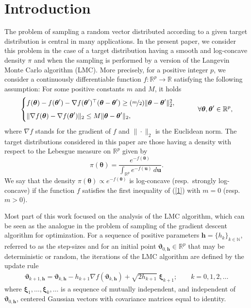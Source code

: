 \documentclass[aoap,preprint,reqno,a4paper]{imsart} %
\newcommand{\RR}{\mathbb{R}}
\newcommand{\NN}{\mathbb{N}}
\newcommand{\btheta}{\boldsymbol{\theta}}
\newcommand{\bvartheta}{\boldsymbol{\vartheta}}
\newcommand{\bxi}{\boldsymbol{\xi}}
\newcommand{\bh}{\boldsymbol h}
\newcommand{\bu}{\boldsymbol u}
\begin{document}


\section{Introduction}

The problem of sampling a random vector distribu\-ted according to a given
target distribution is central in many applications. In the present paper,
we consider this problem in the case of a target distribution having a smooth
and log-concave density $\pi$ and when the sampling is performed by a version of
the Langevin Monte Carlo algorithm (LMC). More precisely,
for a positive integer $p$, we consider a continuously differentiable
function $f:\RR^p\to\RR$ satisfying the following assumption:
For some positive constants $m$ and $M$, it holds
\begin{equation} \label{1}
\begin{cases}
f(\btheta)-f(\btheta')-\nabla f(\btheta')^\top (\btheta-\btheta')
\ge (\nicefrac{m}2)\|\btheta-\btheta'\|_2^2, \text{\vphantom{$I_{\textstyle\int_{I_I}}$}}\\
\|\nabla f(\btheta)-\nabla f(\btheta')\|_2 \le M \|\btheta-\btheta'\|_2,
\end{cases}
\qquad \forall \btheta,\btheta'\in\RR^p,
\end{equation}
where $\nabla f$ stands for the gradient of $f$ and $\|\cdot\|_2$ is the
Euclidean norm. The target distributions considered in this paper are those
having a density with respect to the Lebesgue measure on $\RR^p$ given by
\begin{equation}
\pi(\btheta) = \frac{e^{-f(\btheta)}}{\int_{\RR^p} e^{-f(\bu)}\,d\bu}.
\end{equation}
We say that the density $\pi(\btheta)\propto e^{-f(\btheta)}$ is log-concave
(resp.\ strongly log-concave) if the function $f$ satisfies the first inequality
of (\ref{1}) with $m=0$ (resp.\ $m>0$).

Most part of this work focused on the analysis of the LMC algorithm, which can
be seen as the analogue in the problem of sampling of the gradient descent
algorithm for optimization. For a sequence of positive parameters
$\bh=\{h_k\}_{k\in\NN}$, referred to as the step-sizes and for an initial point
$\bvartheta_{0,\bh}\in\RR^p$  that may be deterministic or random, the iterations of
the LMC algorithm are defined by the update rule
\begin{align}\label{2}
\bvartheta_{k+1,\bh} = \bvartheta_{k,\bh} - h_{k+1} \nabla f(\bvartheta_{k,\bh})+ \sqrt{2h_{k+1}}\;\bxi_{k+1};
\qquad k=0,1,2,\ldots
\end{align}
where  $\bxi_1,\ldots,\bxi_{k},\ldots$ is a sequence of mutually independent, and independent of $\bvartheta_{0,\bh}$, centered Gaussian vectors with covariance
matrices equal to identity.
\end{document}
